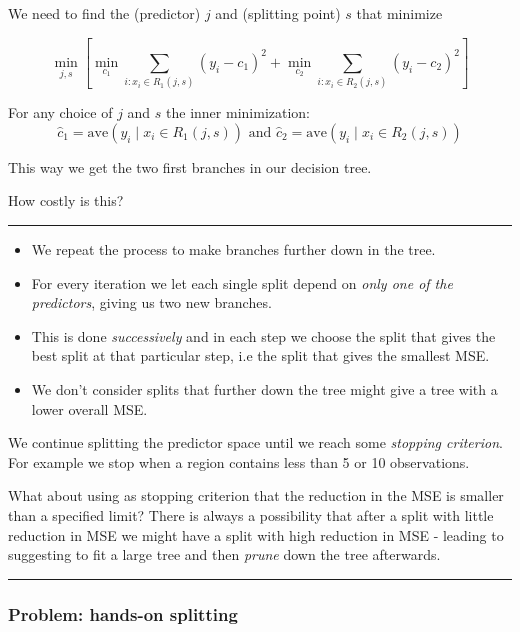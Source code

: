 \documentclass[
  letterpaper,
  DIV=11,
  numbers=noendperiod]{scrartcl}
\providecommand{\tightlist}{%
  \setlength{\itemsep}{0pt}\setlength{\parskip}{0pt}}\usepackage{longtable,booktabs,array}
\begin{document}
We need to find the (predictor) \(j\) and (splitting point) \(s\) that
minimize

\[\min_{j,s} [ \min_{c_1}\sum_{i: x_i \in R_1(j,s)}(y_i-c_1)^2+\min_{c_2} \sum_{i: x_i \in R_2(j,s)}(y_i -c_2)^2]\]

For any choice of \(j\) and \(s\) the inner minimization:
\[ \hat{c}_1=\text{ave}(y_i \mid x_i \in R_1(j,s)) \text{ and }
\hat{c}_2=\text{ave}(y_i \mid x_i \in R_2(j,s))\]

This way we get the two first branches in our decision tree.

How costly is this?

\begin{center}\rule{0.5\linewidth}{0.5pt}\end{center}

\begin{itemize}
\tightlist
\item
  We repeat the process to make branches further down in the tree.
\item
  For every iteration we let each single split depend on \emph{only one
  of the predictors}, giving us two new branches.
\item
  This is done \emph{successively} and in each step we choose the split
  that gives the best split at that particular step, i.e the split that
  gives the smallest MSE.
\item
  We don't consider splits that further down the tree might give a tree
  with a lower overall MSE.
\end{itemize}

We continue splitting the predictor space until we reach some
\emph{stopping criterion}. For example we stop when a region contains
less than 5 or 10 observations.

What about using as stopping criterion that the reduction in the MSE is
smaller than a specified limit? There is always a possibility that after
a split with little reduction in MSE we might have a split with high
reduction in MSE - leading to suggesting to fit a large tree and then
\emph{prune} down the tree afterwards.

\begin{center}\rule{0.5\linewidth}{0.5pt}\end{center}

\hypertarget{problem-hands-on-splitting}{%
\subsubsection{Problem: hands-on
splitting}\label{problem-hands-on-splitting}}
\end{document}
